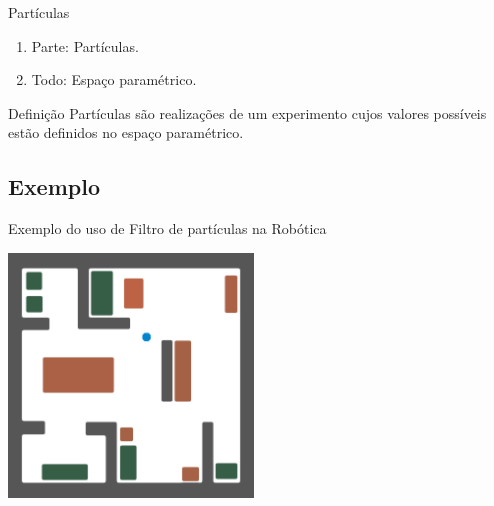 \documentclass{beamer}
\begin{document}
\begin{frame}{Partículas}
\noindent


    \begin{enumerate}
      \item<2-| alert@2> Parte: Partículas.
      \item<3-| alert@3> Todo: Espaço paramétrico.
    \end{enumerate}
    
\pause
\pause
\pause
  \begin{block}{Definição}
  {\large Partículas são realizações de um experimento cujos valores possíveis estão definidos no espaço paramétrico.}
\end{block}


 
\end{frame}


\subsection*{Exemplo}
\begin{frame}{Exemplo do uso de Filtro de partículas na Robótica}

 
  \begin{center}
  \includegraphics[height=6.5cm,keepaspectratio]{1-particle-filter.png}
  \end{center}

\end{frame}
\end{document}
